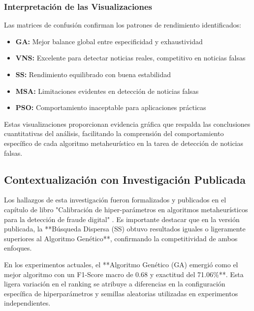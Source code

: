 \newpage

\subsubsection{Interpretación de las Visualizaciones}

Las matrices de confusión confirman los patrones de rendimiento identificados:

\begin{itemize}
    \item \textbf{GA:} Mejor balance global entre especificidad y exhaustividad
    \item \textbf{VNS:} Excelente para detectar noticias reales, competitivo en noticias falsas
    \item \textbf{SS:} Rendimiento equilibrado con buena estabilidad
    \item \textbf{MSA:} Limitaciones evidentes en detección de noticias falsas
    \item \textbf{PSO:} Comportamiento inaceptable para aplicaciones prácticas
\end{itemize}

Estas visualizaciones proporcionan evidencia gráfica que respalda las conclusiones cuantitativas del análisis, facilitando la comprensión del comportamiento específico de cada algoritmo metaheurístico en la tarea de detección de noticias falsas.

\subsection{Contextualización con Investigación Publicada}
\label{subsec:contextualizacion_investigacion}

Los hallazgos de esta investigación fueron formalizados y publicados en el capítulo de libro "Calibración de hiper-parámetros en algoritmos metaheurísticos para la detección de fraude digital" \cite{hurtado2024calibracion}. Es importante destacar que en la versión publicada, la **Búsqueda Dispersa (SS) obtuvo resultados iguales o ligeramente superiores al Algoritmo Genético**, confirmando la competitividad de ambos enfoques.

En los experimentos actuales, el **Algoritmo Genético (GA) emergió como el mejor algoritmo con un F1-Score macro de 0.68 y exactitud del 71.06\%**. Esta ligera variación en el ranking se atribuye a diferencias en la configuración específica de hiperparámetros y semillas aleatorias utilizadas en experimentos independientes.

